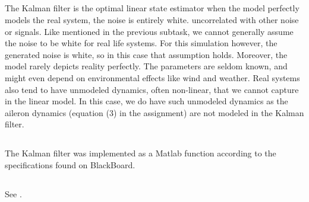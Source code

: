 



\subsection{} %
The Kalman filter is the optimal linear state estimator when the model perfectly models the real system, the noise is entirely white. uncorrelated with other noise or signals. Like mentioned in the previous subtask, we cannot generally assume the noise to be white for real life systems. For this simulation however, the generated noise is white, so in this case that assumption holds. Moreover, the model rarely depicts reality perfectly. The parameters are seldom known, and might even depend on environmental effects like wind and weather. Real systems also tend to have unmodeled dynamics, often non-linear, that we cannot capture in the linear model. In this case, we do have such unmodeled dynamics as the aileron dynamics (equation (3) in the assignment) are not modeled in the Kalman filter.

\subsection{} %
The Kalman filter was implemented as a Matlab function according to the specifications found on BlackBoard. 

\subsection{} %
See . 

